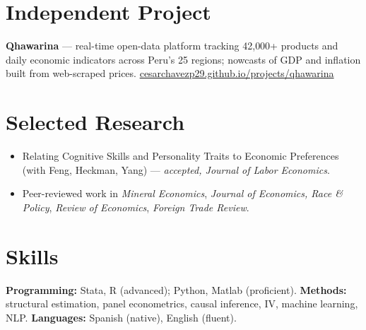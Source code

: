 \documentclass[10pt]{article}
\begin{document}
\section{Independent Project}
\textbf{Qhawarina} --- real-time open-data platform tracking 42{,}000+ products and daily economic indicators across Peru's 25 regions; nowcasts of GDP and inflation built from web-scraped prices. \href{https://cesarchavezp29.github.io/projects/qhawarina/}{cesarchavezp29.github.io/projects/qhawarina}

\section{Selected Research}
\begin{itemize}
\item Relating Cognitive Skills and Personality Traits to Economic Preferences (with Feng, Heckman, Yang) --- \textit{accepted, Journal of Labor Economics}.
\item Peer-reviewed work in \textit{Mineral Economics}, \textit{Journal of Economics, Race \& Policy}, \textit{Review of Economics}, \textit{Foreign Trade Review}.
\end{itemize}

\section{Skills}
\textbf{Programming:} Stata, R (advanced); Python, Matlab (proficient). \quad
\textbf{Methods:} structural estimation, panel econometrics, causal inference, IV, machine learning, NLP. \quad
\textbf{Languages:} Spanish (native), English (fluent).
\end{document}
